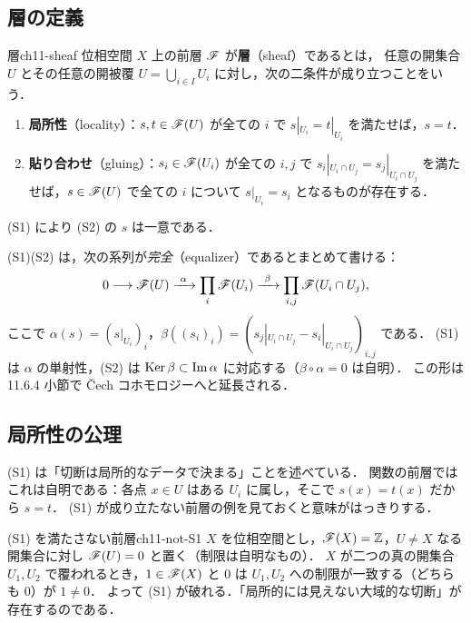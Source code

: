 \subsection{層の定義}

\begin{mydef}{層}{ch11-sheaf}
位相空間 $X$ 上の前層 $\mathscr{F}$ が\textbf{層}（sheaf）であるとは，
任意の開集合 $U$ とその任意の開被覆 $U=\bigcup_{i\in I}U_i$ に対し，次の二条件が成り立つことをいう．
\begin{enumerate}
  \item[(S1)] \textbf{局所性}（locality）：$s,t\in\mathscr{F}(U)$ が全ての $i$ で $s|_{U_i}=t|_{U_i}$ を満たせば，$s=t$．
  \item[(S2)] \textbf{貼り合わせ}（gluing）：$s_i\in\mathscr{F}(U_i)$ が全ての $i,j$ で $s_i|_{U_i\cap U_j}=s_j|_{U_i\cap U_j}$ を満たせば，$s\in\mathscr{F}(U)$ で全ての $i$ について $s|_{U_i}=s_i$ となるものが存在する．
\end{enumerate}
(S1) により (S2) の $s$ は一意である．
\end{mydef}

(S1)(S2) は，次の系列が\emph{完全}（equalizer）であるとまとめて書ける：
\begin{equation}\label{eq:ch11-equalizer}
  0\longrightarrow \sheaf{F}(U)\xrightarrow{\ \alpha\ }\prod_{i}\sheaf{F}(U_i)\xrightarrow{\ \beta\ }\prod_{i,j}\sheaf{F}(U_i\cap U_j),
\end{equation}
ここで $\alpha(s)=(s|_{U_i})_i$，$\beta((s_i)_i) = (s_j|_{U_i\cap U_j}-s_i|_{U_i\cap U_j})_{i,j}$ である．
(S1) は $\alpha$ の単射性，(S2) は $\operatorname{Ker}\beta\subset\operatorname{Im}\alpha$ に対応する（$\beta\circ\alpha=0$ は自明）．
この形は 11.6.4 小節で Čech コホモロジーへと延長される．

\subsection{局所性の公理}

(S1) は「切断は局所的なデータで決まる」ことを述べている．
関数の前層ではこれは自明である：各点 $x\in U$ はある $U_i$ に属し，そこで $s(x)=t(x)$ だから $s=t$．
(S1) が成り立たない前層の例を見ておくと意味がはっきりする．

\begin{myex}{(S1) を満たさない前層}{ch11-not-S1}
$X$ を位相空間とし，$\mathscr{F}(X)=\mathbb{Z}$，$U\neq X$ なる開集合に対し $\mathscr{F}(U)=0$ と置く（制限は自明なもの）．
$X$ が二つの真の開集合 $U_1,U_2$ で覆われるとき，$1\in\mathscr{F}(X)$ と $0$ は $U_1,U_2$ への制限が一致する（どちらも $0$）が $1\ne0$．
よって (S1) が破れる．「局所的には見えない大域的な切断」が存在するのである．
\end{myex}

